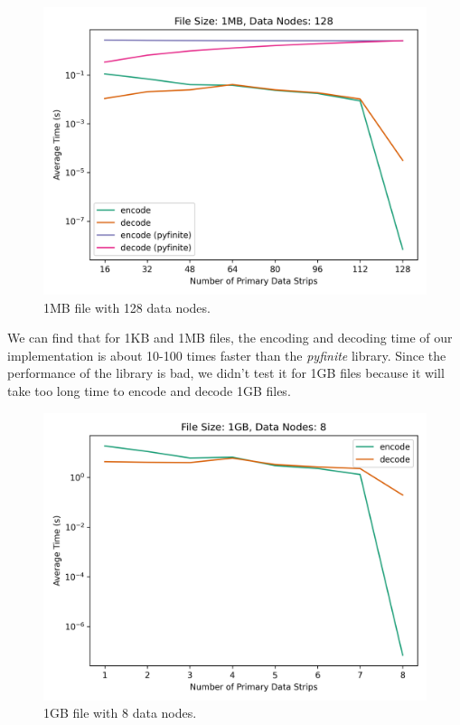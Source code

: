 \documentclass[conference]{IEEEtran}
\begin{document}
\begin{figure}[htbp]
    \centering
    \includegraphics[width=0.8\columnwidth
]{images/encode-decode-size-1MB-n-128.png}
    \caption{1MB file with 128 data nodes.}
    \label{fig:encode-decode-1MB-128}
\end{figure}

We can find that for 1KB and 1MB files, the encoding and decoding time of our implementation is about 10-100 times faster than the \textit{pyfinite} library. Since the performance of the library is bad, we didn't test it for 1GB files because it will take too long time to encode and decode 1GB files.

\begin{figure}[htbp]
    \centering
    \includegraphics[width=0.8\columnwidth
]{images/encode-decode-size-1GB-n-8.png}
    \caption{1GB file with 8 data nodes.}
    \label{fig:encode-decode-1GB-8}
\end{figure}
\end{document}
